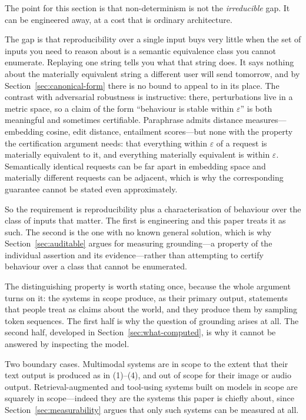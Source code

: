 \documentclass[11pt]{article}
\theoremstyle{plain}
\theoremstyle{definition}
\begin{document}
The point for this section is that non-determinism is not the \emph{irreducible}
gap. It can be engineered away, at a cost that is ordinary architecture.

The gap is that reproducibility over a single input buys very little when the set of
inputs you need to reason about is a semantic equivalence class you cannot
enumerate. Replaying one string tells you what that string does. It says nothing
about the materially equivalent string a different user will send tomorrow, and by
Section~\ref{sec:canonical-form} there is no bound to appeal to in its place. The
contrast with adversarial robustness is instructive: there, perturbations live in a
metric space, so a claim of the form ``behaviour is stable within $\varepsilon$'' is
both meaningful and sometimes certifiable. Paraphrase admits distance measures---
embedding cosine, edit distance, entailment scores---but none with the property the
certification argument needs: that everything within $\varepsilon$ of a request is
materially equivalent to it, and everything materially equivalent is within
$\varepsilon$. Semantically identical requests can be far apart in embedding space
and materially different requests can be adjacent, which is why the corresponding
guarantee cannot be stated even approximately.

So the requirement is reproducibility plus a characterisation of behaviour over the
class of inputs that matter. The first is engineering and this paper treats it as
such. The second is the one with no known general solution, which is why
Section~\ref{sec:auditable} argues for measuring grounding---a property of the
individual assertion and its evidence---rather than attempting to certify behaviour
over a class that cannot be enumerated.

The distinguishing property is worth stating once, because the whole argument turns
on it: the systems in scope produce, as their primary output, statements that people
treat as claims about the world, and they produce them by sampling token sequences.
The first half is why the question of grounding arises at all. The second half,
developed in Section~\ref{sec:what-computed}, is why it cannot be answered by
inspecting the model.

Two boundary cases. Multimodal systems are in scope to the extent that their
text output is produced as in (1)--(4), and out of scope for their image or audio
output. Retrieval-augmented and tool-using systems built on models in scope are
squarely in scope---indeed they are the systems this paper is chiefly about, since
Section~\ref{sec:measurability} argues that only such systems can be measured at
all.
\end{document}
